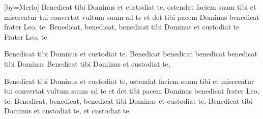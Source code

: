 [by={Merlo}]
\chordsoff
\beginverse
Benedicat tibi Dominus et custodiat te,
ostendat faciem suam tibi et misereatur tui 
convertat vultum suum ad te
et det tibi pacem
Dominus benedicat frater Leo, te.
\endverse
\beginchorus
Benedicat, benedicat,
benedicat tibi Dominus
et custodiat te Frater Leo, te

Benedicat tibi Dominus et custodiat te.
\endchorus
\beginverse
Benedicat benedicat benedicat benedicat tibi Dominus
Benedicat tibi Dominus et custodiat te,

Benedicat tibi Dominus et custodiat te,
ostendat faciem suam tibi et misereatur tui 
convertat vultum suum ad te
et det tibi pacem
Dominus benedicat frater Leo, te.
\endverse
\beginchorus
Benedicat, benedicat,
benedicat tibi Dominus et custodiat te.
Benedicat tibi Dominus et custodiat te,
et custodiat te.
\endchorus
\endsong


